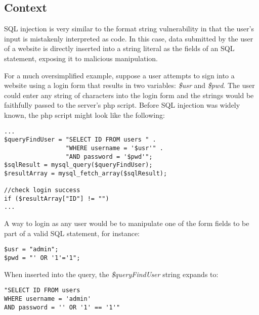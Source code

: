 \subsection{Context} \label{l4_ctx}
SQL injection is very similar to the format string vulnerability in that the user's input is mistakenly interpreted as code. In this case, data submitted by the user of a website is directly inserted into a string literal as the fields of an SQL statement, exposing it to malicious manipulation.

For a much oversimplified example, suppose a user attempts to sign into a website using a login form that results in two variables: \emph{\$usr} and \emph{\$pwd}. The user could enter any string of characters into the login form and the strings would be faithfully passed to the server's php script. Before SQL injection was widely known, the php script might look like the following:

\begin{minipage}{\linewidth}
\begin{lstlisting}[caption={Vulnerable SQL statement construction},
label={lst:l4_ctx_vulnstm},
frame=single]
...
$queryFindUser = "SELECT ID FROM users " .
                 "WHERE username = '$usr'" .
                 "AND password = '$pwd'";
$sqlResult = mysql_query($queryFindUser);
$resultArray = mysql_fetch_array($sqlResult);

//check login success
if ($resultArray["ID"] != "")
...
\end{lstlisting}
\end{minipage}

A way to login as any user would be to manipulate one of the form fields to be part of a valid SQL statement, for instance:

\begin{minipage}{\linewidth}
\begin{lstlisting}[caption={Malicious login strings passed from the login form},
label={lst:l4_ctx_hackpwd},
frame=single]
$usr = "admin";
$pwd = "' OR '1'='1";
\end{lstlisting}
\end{minipage}

When inserted into the query, the \emph{\$queryFindUser} string expands to:

\begin{minipage}{\linewidth}
\begin{lstlisting}[caption={Vulnerable SQL statement expansion},
label={lst:l4_ctx_hackquery},
frame=single]
"SELECT ID FROM users
WHERE username = 'admin'
AND password = '' OR '1' == '1'"
\end{lstlisting}
\end{minipage}

